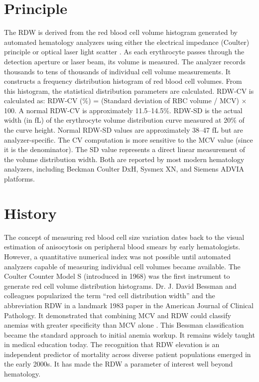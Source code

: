 \section*{Principle}
The RDW is derived from the red blood cell volume histogram generated by automated hematology analyzers using either the electrical impedance (Coulter) principle or optical laser light scatter \cite{tietz2012textbook}. As each erythrocyte passes through the detection aperture or laser beam, its volume is measured. The analyzer records thousands to tens of thousands of individual cell volume measurements. It constructs a frequency distribution histogram of red blood cell volumes. From this histogram, the statistical distribution parameters are calculated. RDW-CV is calculated as: RDW-CV (\%) = (Standard deviation of RBC volume / MCV) $\times$ 100. A normal RDW-CV is approximately 11.5--14.5\%. RDW-SD is the actual width (in fL) of the erythrocyte volume distribution curve measured at 20\% of the curve height. Normal RDW-SD values are approximately 38--47 fL but are analyzer-specific. The CV computation is more sensitive to the MCV value (since it is the denominator). The SD value represents a direct linear measurement of the volume distribution width. Both are reported by most modern hematology analyzers, including Beckman Coulter DxH, Sysmex XN, and Siemens ADVIA platforms.

\section*{History}
The concept of measuring red blood cell size variation dates back to the visual estimation of anisocytosis on peripheral blood smears by early hematologists. However, a quantitative numerical index was not possible until automated analyzers capable of measuring individual cell volumes became available. The Coulter Counter Model S (introduced in 1968) was the first instrument to generate red cell volume distribution histograms. Dr. J. David Bessman and colleagues popularized the term ``red cell distribution width'' and the abbreviation RDW in a landmark 1983 paper in the American Journal of Clinical Pathology. It demonstrated that combining MCV and RDW could classify anemias with greater specificity than MCV alone \cite{bessman1983improved}. This Bessman classification became the standard approach to initial anemia workup. It remains widely taught in medical education today. The recognition that RDW elevation is an independent predictor of mortality across diverse patient populations emerged in the early 2000s. It has made the RDW a parameter of interest well beyond hematology.

